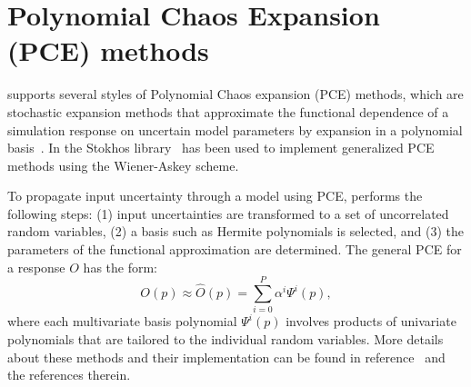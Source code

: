 


\clearpage
\section{Polynomial Chaos Expansion (PCE) methods}
\label{PCE_Analysis}
\label{pce_Overview}
  

\Xyce{} supports several styles of Polynomial Chaos expansion (PCE) methods, which are 
stochastic expansion methods that approximate the functional dependence
of a simulation response on uncertain model parameters by expansion
in a polynomial basis~\cite{XiuKarn02,Xiu2010}.   
In \Xyce{} the Stokhos library~\cite{stokhos} has been used to implement 
generalized PCE methods using the Wiener-Askey scheme\cite{XiuKarn02}.   

To propagate input uncertainty through a model using PCE, \Xyce{}
performs the following steps: (1) input uncertainties are transformed
to a set of uncorrelated random variables, (2) a basis such
as Hermite polynomials is selected, and (3) the parameters of the
functional approximation are determined.  The general PCE 
for a response $O$ has the form:
\begin{equation}
  O(p) \approx \hat{O}(p) = \sum_{i=0}^{P} \alpha^i \varPsi^i(p),
  \label{eq:genPCEresponse}
\end{equation}
where each multivariate basis polynomial $\varPsi^i(p)$ involves products of univariate
polynomials that are tailored to the individual random variables. 
More details about these methods and their \Xyce{} implementation can be found in
reference~\cite{xyceAdvancedUQ} and the references therein.

